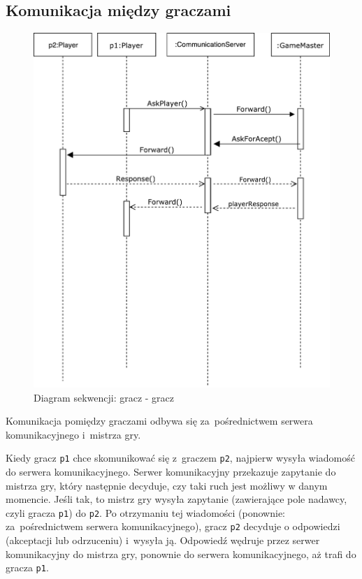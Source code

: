 \documentclass[a4paper]{article}
\newcommand{\code}{\texttt}
\begin{document}
\subsection{Komunikacja między graczami}
\begin{figure}[H]
\caption{Diagram sekwencji: gracz - gracz}
\centering
\includegraphics[scale=0.8]{sekwencje3.pdf}
\end{figure}

Komunikacja pomiędzy graczami odbywa się za~pośrednictwem serwera komunikacyjnego i~mistrza gry.

Kiedy gracz \code{p1} chce skomunikować się z~graczem \code{p2}, najpierw wysyła wiadomość do serwera komunikacyjnego.
Serwer komunikacyjny przekazuje zapytanie do mistrza gry, który następnie decyduje, czy taki ruch jest możliwy w danym momencie.
Jeśli tak, to mistrz gry wysyła zapytanie (zawierające pole nadawcy, czyli gracza \code{p1}) do \code{p2}.
Po otrzymaniu tej wiadomości (ponownie: za~pośrednictwem serwera komunikacyjnego), gracz \code{p2} decyduje o odpowiedzi (akceptacji lub odrzuceniu) i~wysyła ją. Odpowiedź wędruje przez serwer komunikacyjny do mistrza gry, ponownie do serwera komunikacyjnego, aż trafi do gracza \code{p1}.
\end{document}
